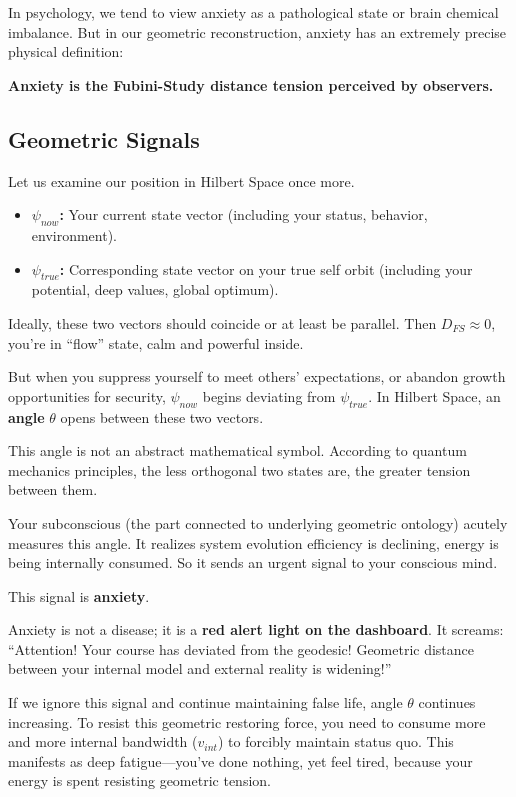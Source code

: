 \documentclass[11pt,a4paper,twoside]{book}
\begin{document}
In psychology, we tend to view anxiety as a pathological state or brain chemical imbalance. But in our geometric reconstruction, anxiety has an extremely precise physical definition:

\textbf{Anxiety is the Fubini-Study distance tension perceived by observers.}

\subsection{Geometric Signals}

Let us examine our position in Hilbert Space once more.

\begin{itemize}
\item \textbf{$\psi_{now}$:} Your current state vector (including your status, behavior, environment).

\item \textbf{$\psi_{true}$:} Corresponding state vector on your true self orbit (including your potential, deep values, global optimum).
\end{itemize}

Ideally, these two vectors should coincide or at least be parallel. Then $D_{FS} \approx 0$, you're in ``flow'' state, calm and powerful inside.

But when you suppress yourself to meet others' expectations, or abandon growth opportunities for security, $\psi_{now}$ begins deviating from $\psi_{true}$. In Hilbert Space, an \textbf{angle} $\theta$ opens between these two vectors.

This angle is not an abstract mathematical symbol. According to quantum mechanics principles, the less orthogonal two states are, the greater tension between them.

Your subconscious (the part connected to underlying geometric ontology) acutely measures this angle. It realizes system evolution efficiency is declining, energy is being internally consumed. So it sends an urgent signal to your conscious mind.

This signal is \textbf{anxiety}.

Anxiety is not a disease; it is a \textbf{red alert light on the dashboard}. It screams: ``Attention! Your course has deviated from the geodesic! Geometric distance between your internal model and external reality is widening!''

If we ignore this signal and continue maintaining false life, angle $\theta$ continues increasing. To resist this geometric restoring force, you need to consume more and more internal bandwidth ($v_{int}$) to forcibly maintain status quo. This manifests as deep fatigue---you've done nothing, yet feel tired, because your energy is spent resisting geometric tension.
\end{document}
